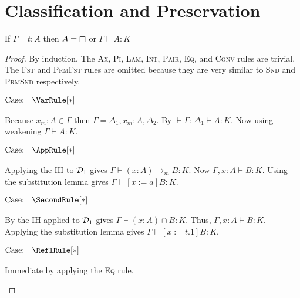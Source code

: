 \section{Classification and Preservation}

\begin{lemma}
    If $\Gamma \vdash t : A$ then $A = \kind$ or $\Gamma \vdash A : K$
\end{lemma}
\begin{proof}
    By induction.
    The \textsc{Ax}, \textsc{Pi}, \textsc{Lam}, \textsc{Int}, \textsc{Pair}, \textsc{Eq}, and \textsc{Conv} rules are trivial.
    The \textsc{Fst} and \textsc{PrmFst} rules are omitted because they are very similar to \textsc{Snd} and \textsc{PrmSnd} respectively.

    $\text{Case: }\begin{array}{c} \VarRule[*] \end{array}$
    \begin{proofcase}
        Because $x_m : A \in \Gamma$ then $\Gamma = \Delta_1, x_m : A, \Delta_2$.
        By $\vdash \Gamma$: $\Delta_1 \vdash A : K$.
        Now using weakening $\Gamma \vdash A : K$.
    \end{proofcase}

    $\text{Case: }\begin{array}{c} \AppRule[*] \end{array}$
    \begin{proofcase}
        Applying the IH to $\mathcal{D}_{1}$ gives $\Gamma \vdash (x : A) \to_m B : K$.
        Now $\Gamma, x : A \vdash B : K$.
        Using the substitution lemma gives $\Gamma \vdash [x := a]B : K$.
    \end{proofcase}

    $\text{Case: }\begin{array}{c} \SecondRule[*] \end{array}$
    \begin{proofcase}
        By the IH applied to $\mathcal{D}_{1}$ gives $\Gamma \vdash (x : A )\cap B : K$.
        Thus, $\Gamma, x : A \vdash B : K$.
        Applying the substitution lemma gives $\Gamma \vdash [x := t.1]B : K$.
    \end{proofcase}

    $\text{Case: }\begin{array}{c} \ReflRule[*] \end{array}$
    \begin{proofcase}
        Immediate by applying the \textsc{Eq} rule.
    \end{proofcase}


\end{proof}
